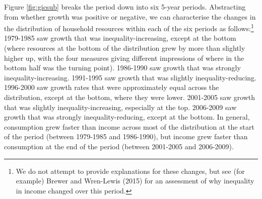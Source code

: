 Figure \ref{fig:gicsub} breaks the period down into six 5-year periods. Abstracting from whether growth was positive or negative, we can characterise the changes in the distribution of household resources within each of the six periods as follows:\footnote{We do not attempt to provide explanations for these changes, but see (for example) Brewer and Wren-Lewis (2015) for an assessment of why inequality in income changed over this period.} 1979-1985 saw growth that was inequality-increasing, except at the bottom (where resources at the bottom of the distribution grew by more than slightly higher up, with the four measures giving different impressions of where in the bottom half was the turning point). 1986-1990 saw growth that was strongly inequality-increasing. 1991-1995 saw growth that was slightly inequality-reducing. 1996-2000 saw growth rates that were approximately equal across the distribution, except at the bottom, where they were lower. 2001-2005 saw growth that was slightly inequality-increasing, especially at the top. 2006-2009 saw growth that was strongly inequality-reducing, except at the bottom. In general, consumption grew faster than income across most of the distribution at the start of the period (between 1979-1985 and 1986-1990), but income grew faster than consumption at the end of the period (between 2001-2005 and 2006-2009).

